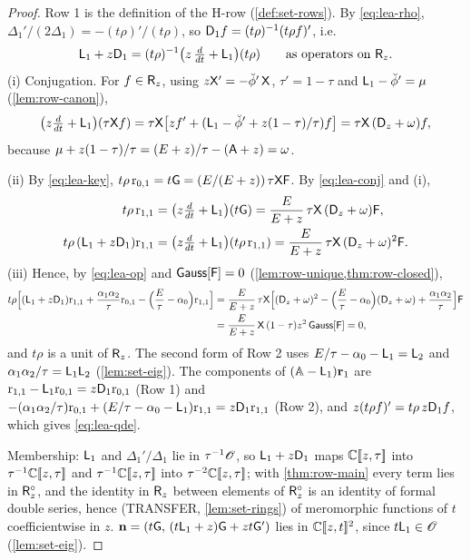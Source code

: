 \begin{proof}
Row 1 is the definition of the H-row (\cref{def:set-rows}). By \eqref{eq:lea-rho}, $\Delta_1'/(2\Delta_1) = -(t\rho)'/(t\rho)$, so $\mathsf{D}_1f = (t\rho)^{-1}(t\rho f)'$, i.e.
\begin{equation}
\label{eq:lea-conj}
\mathsf{L}_1 + z\mathsf{D}_1 = (t\rho)^{-1}\bigl(z\,\tfrac{d}{dt} + \mathsf{L}_1\bigr)(t\rho)\qquad\text{as operators on }\mathsf{R}_{z} .
\end{equation}
(i) Conjugation. For $f\in\mathsf{R}_{z}$, using $z\mathsf{X}' = -\breve{\phi}'\,\mathsf{X}$, $\tau' = 1-\tau$ and $\mathsf{L}_1 - \breve{\phi}' = \mu$ (\cref{lem:row-canon}),
\[
\bigl(z\tfrac{d}{dt} + \mathsf{L}_1\bigr)(\tau\mathsf{X} f) = \tau\mathsf{X}\bigl[zf' + (\mathsf{L}_1 - \breve{\phi}' + z(1-\tau)/\tau)f\bigr] = \tau\mathsf{X}\,(\mathsf{D}_{z}+\omega)f,
\]
because $\mu + z(1-\tau)/\tau = (E+z)/\tau - (\mathsf{A}+z) = \omega$.

(ii) By \eqref{eq:lea-key}, $t\rho\,\mathrm{r}_{0,1} = t\mathsf{G} = (E/(E+z))\,\tau\mathsf{X}\mathsf{F}$. By \eqref{eq:lea-conj} and (i),
\begin{align*}
t\rho\,\mathrm{r}_{1,1} &= \bigl(z\tfrac{d}{dt}+\mathsf{L}_1\bigr)(t\mathsf{G}) = \frac{E}{E+z}\,\tau\mathsf{X}\,(\mathsf{D}_{z}+\omega)\mathsf{F},\\
t\rho\,(\mathsf{L}_1+z\mathsf{D}_1)\mathrm{r}_{1,1} &= \bigl(z\tfrac{d}{dt}+\mathsf{L}_1\bigr)(t\rho\,\mathrm{r}_{1,1}) = \frac{E}{E+z}\,\tau\mathsf{X}\,(\mathsf{D}_{z}+\omega)^2\mathsf{F} .
\end{align*}
(iii) Hence, by \eqref{eq:lea-op} and $\mathsf{Gauss}[\mathsf{F}] = 0$ (\cref{lem:row-unique,thm:row-closed}),
\begin{align*}
t\rho\Bigl[(\mathsf{L}_1+z\mathsf{D}_1)\mathrm{r}_{1,1} + \frac{\alpha_1\alpha_2}{\tau}\mathrm{r}_{0,1} - \Bigl(\frac{E}{\tau}-\alpha_0\Bigr)\mathrm{r}_{1,1}\Bigr]
&= \frac{E}{E+z}\,\tau\mathsf{X}\Bigl[(\mathsf{D}_{z}+\omega)^2 - \Bigl(\frac{E}{\tau}-\alpha_0\Bigr)(\mathsf{D}_{z}+\omega) + \frac{\alpha_1\alpha_2}{\tau}\Bigr]\mathsf{F}\\
&= \frac{E}{E+z}\,\mathsf{X}\,(1-\tau)z^2\,\mathsf{Gauss}[\mathsf{F}] = 0,
\end{align*}
and $t\rho$ is a unit of $\mathsf{R}_{z}$. The second form of Row 2 uses $E/\tau - \alpha_0 - \mathsf{L}_1 = \mathsf{L}_2$ and $\alpha_1\alpha_2/\tau = \mathsf{L}_1\mathsf{L}_2$ (\cref{lem:set-eig}). The components of $(\mathbb{A}-\mathsf{L}_1)\mathbf{r}_1$ are $\mathrm{r}_{1,1} - \mathsf{L}_1\mathrm{r}_{0,1} = z\mathsf{D}_1\mathrm{r}_{0,1}$ (Row 1) and $-(\alpha_1\alpha_2/\tau)\mathrm{r}_{0,1} + (E/\tau-\alpha_0-\mathsf{L}_1)\mathrm{r}_{1,1} = z\mathsf{D}_1\mathrm{r}_{1,1}$ (Row 2), and $z(t\rho f)' = t\rho\,z\mathsf{D}_1f$, which gives \eqref{eq:lea-qde}.

Membership: $\mathsf{L}_1$ and $\Delta_1'/\Delta_1$ lie in $\tau^{-1}\mathscr{O}$, so $\mathsf{L}_1 + z\mathsf{D}_1$ maps $\mathbb{C}[\![ z,\tau ]\!]$ into $\tau^{-1}\mathbb{C}[\![ z,\tau ]\!]$ and $\tau^{-1}\mathbb{C}[\![ z,\tau ]\!]$ into $\tau^{-2}\mathbb{C}[\![ z,\tau ]\!]$; with \cref{thm:row-main} every term lies in $\mathsf{R}_{z}^{\circ}$, and the identity in $\mathsf{R}_{z}$ between elements of $\mathsf{R}_{z}^{\circ}$ is an identity of formal double series, hence (TRANSFER, \cref{lem:set-rings}) of meromorphic functions of $t$ coefficientwise in $z$. $\mathbf{n} = (t\mathsf{G},\,(t\mathsf{L}_1+z)\mathsf{G} + zt\mathsf{G}')$ lies in $\mathbb{C}[\![ z,t ]\!]^2$, since $t\mathsf{L}_1\in\mathscr{O}$ (\cref{lem:set-eig}).
\end{proof}

